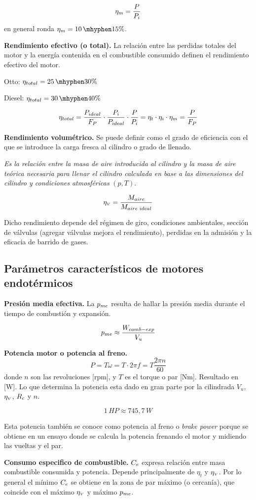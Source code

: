 \[
\eta_m = \frac{P}{P_i}
\]
en general ronda $\eta_m=10\hyph15 \%$.


\textbf{Rendimiento efectivo (o total).} La relación entre las perdidas totales del motor y la energía contenida en el combustible consumido definen el rendimiento efectivo del motor.

Otto: $\etaeff=25\hyph30\%$

Diesel: $\etaeff = 30\hyph 40\%$

\[
\eta_{total}=\frac{P_{{ideal}}}{F_P}\cdot\frac{P_i}{P_{ideal}}\cdot \frac{P}{P_i}=\eta_t\cdot \eta_i \cdot \eta_m = \frac{P}{F_P}
\]

\textbf{Rendimiento volumétrico.} Se puede definir como el grado de eficiencia con el que se introduce la carga fresca al cilindro o grado de llenado.

\textit{Es la relación entre la masa de aire introducida al cilindro y la masa de aire teórica necesaria para llenar el cilindro calculada en base a las dimensiones del cilindro y condiciones atmosféricas} $(p,T)$.

\[
\eta_{{\mbox{\tiny$V$}}} = \frac{M_{aire}}{M_{aire\textrm{ }{ideal} }}
\]

Dicho rendimiento depende del régimen de giro, condiciones ambientales, sección de válvulas (agregar válvulas mejora el rendimiento), perdidas en la admisión y la eficacia de barrido de gases.

\subsection{Parámetros característicos de motores endotérmicos} 


\textbf{Presión media efectiva.} La $p_{me}$ resulta de hallar la presión media durante el tiempo de combustión y expansión. 

\[
p_{me} \approx \frac{W_{comb-exp}}{V_u}
\]


\textbf{Potencia motor o potencia al freno.} 
\[
P=T\omega=T \cdot 2 \pi f = T \frac{2\pi n}{60}
\]
donde $n$ son las revoluciones [rpm], y $T$ es el torque o par [Nm]. Resultado en [W]. Lo que determina la potencia esta dado en gran parte por la cilindrada $V_u$, $\eta_{{\mbox{\tiny$V$}}}$, $R_c$ y $n$.

\[
1\, HP \approx 745,7\, W
\]

Esta potencia también se conoce como potencia al freno o \textit{brake power} porque se obtiene en un ensayo donde se calcula la potencia frenando el motor y midiendo las vueltas y el par.

\textbf{Consumo especifico de combustible.} $C_e$ expresa relación entre masa combustible consumida y potencia. Depende principalmente de $\eta_t$ y $\eta_{{\mbox{\tiny$V$}}}$. Por lo general el mínimo $C_e$ se obtiene en la zona de par máximo (o cercanía), que coincide con el máximo $\eta_{{\mbox{\tiny$V$}}}$ y máximo $p_{me}$.


